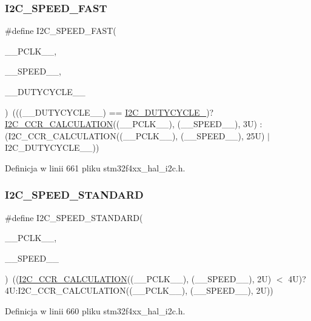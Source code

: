 \subsubsection{\texorpdfstring{I2\+C\+\_\+\+S\+P\+E\+E\+D\+\_\+\+F\+A\+ST}{I2C\_SPEED\_FAST}}
{\footnotesize\ttfamily \#define I2\+C\+\_\+\+S\+P\+E\+E\+D\+\_\+\+F\+A\+ST(\begin{DoxyParamCaption}\item[{}]{\+\_\+\+\_\+\+P\+C\+L\+K\+\_\+\+\_\+,  }\item[{}]{\+\_\+\+\_\+\+S\+P\+E\+E\+D\+\_\+\+\_\+,  }\item[{}]{\+\_\+\+\_\+\+D\+U\+T\+Y\+C\+Y\+C\+L\+E\+\_\+\+\_\+ }\end{DoxyParamCaption})~(((\+\_\+\+\_\+\+D\+U\+T\+Y\+C\+Y\+C\+L\+E\+\_\+\+\_\+) == \hyperlink{group___i2_c__duty__cycle__in__fast__mode_ga414df076d339793a7c761033346fd4ca}{I2\+C\+\_\+\+D\+U\+T\+Y\+C\+Y\+C\+L\+E\+\_})? \hyperlink{group___i2_c___private___macros_ga647da9b3c71c56e2e1b49417bc557233}{I2\+C\+\_\+\+C\+C\+R\+\_\+\+C\+A\+L\+C\+U\+L\+A\+T\+I\+ON}((\+\_\+\+\_\+\+P\+C\+L\+K\+\_\+\+\_\+), (\+\_\+\+\_\+\+S\+P\+E\+E\+D\+\_\+\+\_\+), 3\+U) \+: (\+I2\+C\+\_\+\+C\+C\+R\+\_\+\+C\+A\+L\+C\+U\+L\+A\+T\+I\+O\+N((\+\_\+\+\_\+\+P\+C\+L\+K\+\_\+\+\_\+), (\+\_\+\+\_\+\+S\+P\+E\+E\+D\+\_\+\+\_\+), 25\+U) $\vert$ I2\+C\+\_\+\+D\+U\+T\+Y\+C\+Y\+C\+L\+E\+\_\+\_))}



Definicja w linii 661 pliku stm32f4xx\+\_\+hal\+\_\+i2c.\+h.

\mbox{\label{group___i2_c___private___macros_gaa71590c93b126e79fc86afbc819742b3}} 
\subsubsection{\texorpdfstring{I2\+C\+\_\+\+S\+P\+E\+E\+D\+\_\+\+S\+T\+A\+N\+D\+A\+RD}{I2C\_SPEED\_STANDARD}}
{\footnotesize\ttfamily \#define I2\+C\+\_\+\+S\+P\+E\+E\+D\+\_\+\+S\+T\+A\+N\+D\+A\+RD(\begin{DoxyParamCaption}\item[{}]{\+\_\+\+\_\+\+P\+C\+L\+K\+\_\+\+\_\+,  }\item[{}]{\+\_\+\+\_\+\+S\+P\+E\+E\+D\+\_\+\+\_\+ }\end{DoxyParamCaption})~((\hyperlink{group___i2_c___private___macros_ga647da9b3c71c56e2e1b49417bc557233}{I2\+C\+\_\+\+C\+C\+R\+\_\+\+C\+A\+L\+C\+U\+L\+A\+T\+I\+ON}((\+\_\+\+\_\+\+P\+C\+L\+K\+\_\+\+\_\+), (\+\_\+\+\_\+\+S\+P\+E\+E\+D\+\_\+\+\_\+), 2\+U) $<$ 4\+U)? 4\+U\+:\+I2\+C\+\_\+\+C\+C\+R\+\_\+\+C\+A\+L\+C\+U\+L\+A\+T\+I\+O\+N((\+\_\+\+\_\+\+P\+C\+L\+K\+\_\+\+\_\+), (\+\_\+\+\_\+\+S\+P\+E\+E\+D\+\_\+\+\_\+), 2\+U))}



Definicja w linii 660 pliku stm32f4xx\+\_\+hal\+\_\+i2c.\+h.


